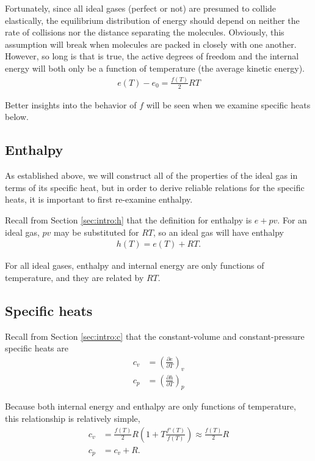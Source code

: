 Fortunately, since all ideal gases (perfect or not) are presumed to collide elastically, the equilibrium distribution of energy should depend on neither the rate of collisions nor the distance separating the molecules.  Obviously, this assumption will break when molecules are packed in closely with one another.  However, so long is that is true, the active degrees of freedom and the internal energy will both only be a function of temperature (the average kinetic energy).
\begin{align}
e(T) - e_0 = \frac{f(T)}{2} R T \label{eqn:ig:e}
\end{align}

Better insights into the behavior of $f$ will be seen when we examine specific heats below.

\subsection{Enthalpy}

As established above, we will construct all of the properties of the ideal gas in terms of its specific heat, but in order to derive reliable relations for the specific heats, it is important to first re-examine enthalpy.

Recall from Section \ref{sec:intro:h} that the definition for enthalpy is $e + pv$.  For an ideal gas, $pv$ may be substituted for $R T$, so an ideal gas will have enthalpy
\begin{align}
h(T) = e(T) + RT.\label{eqn:ig:h}
\end{align}

For all ideal gases, enthalpy and internal energy are only functions of temperature, and they are related by $RT$.

\subsection{Specific heats}

Recall from Section \ref{sec:intro:c} that the constant-volume and constant-pressure specific heats are
\begin{align}
c_v &= \left( \frac{\partial e}{\partial T} \right)_v\nonumber\\
c_p &= \left( \frac{\partial h}{\partial T} \right)_p\nonumber
\end{align}

Because both internal energy and enthalpy are only functions of temperature, this relationship is relatively simple,
\begin{align}
c_v &= \frac{f(T)}{2} R \left( 1 + T\frac{f'(T)}{f(T)}\right) \approx \frac{f(T)}{2} R \label{eqn:ig:cv}\\
c_p &= c_v + R\label{eqn:ig:cp}.
\end{align}

